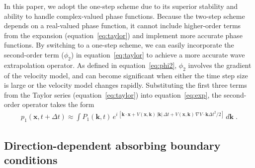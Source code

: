 In this paper, we adopt the one-step scheme due to its superior stability and ability to handle complex-valued phase functions. Because the two-step scheme depends on a real-valued phase function, it cannot include higher-order terms from the expansion (equation~\ref{eq:taylor}) and implement more accurate phase functions. By switching to a one-step scheme, we can easily incorporate the second-order term ($\phi_2$) in equation~\ref{eq:taylor} to achieve a more accurate wave extrapolation operator. As defined in equation~\ref{eq:phi2}, $\phi_2$ involves the gradient of the velocity model, and can become significant when either the time step size is large or the velocity model changes rapidly. Substituting the first three terms from the Taylor series (equation~\ref{eq:taylor}) into equation~\ref{eq:exp}, the second-order operator takes the form
\begin{eqnarray}
  \label{eq:gradient}
p_1(\mathbf{x},t+\Delta t) \approx \int P_1(\mathbf{k},t)\,e^{i\,\left[\mathbf{k} \cdot \mathbf{x}+V(\mathbf{x},\mathbf{k})\,|\mathbf{k}|\,\Delta t + V(\mathbf{x},\mathbf{k})\,\nabla V \cdot \mathbf{k} {\Delta t}^2/2 \right]}\,d\mathbf{k}\;.
\end{eqnarray}

\subsection{Direction-dependent absorbing boundary conditions}

